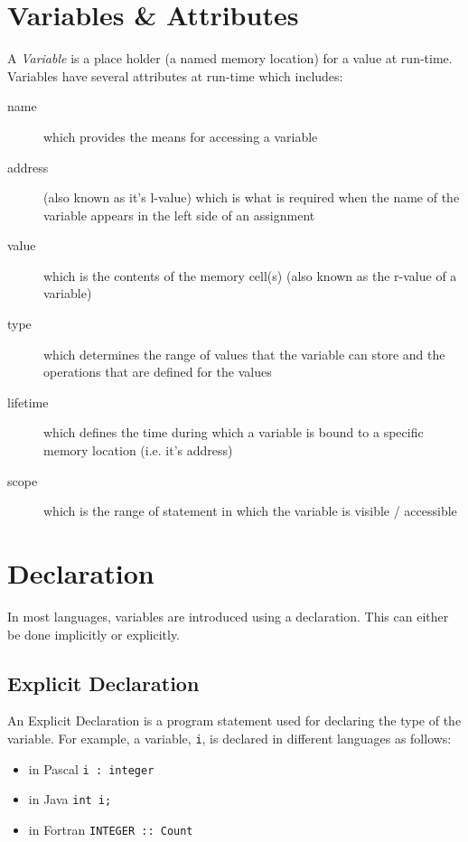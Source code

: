 

\section{Variables \& Attributes}
A \textit{Variable} is a place holder (a named memory location) for a value at run-time. Variables have several attributes at run-time which includes:
\begin{description}
    \item[name] which provides the means for accessing a variable
    \item[address] (also known as it's l-value) which is what is required when the name of the variable appears in the left side of an assignment 
    \item[value] which is the contents of the memory cell(s) (also known as the r-value of a variable)
    \item[type] which determines the range of values that the variable can store and the operations that are defined for the values
    \item[lifetime] which defines the time during which a variable is bound to a specific memory location (i.e. it's address) 
    \item[scope] which is the range of statement in which the variable is visible / accessible 
\end{description}

\section{Declaration}
In most languages, variables are introduced using a declaration. This can either be done implicitly or explicitly.
\subsection{Explicit Declaration}
An Explicit Declaration is a program statement used for declaring the type of the variable. For example, a variable, \verb|i|, is declared in different languages as follows:
\begin{itemize}
    \item in Pascal \verb|i : integer|
    \item in Java \verb|int i;|
    \item in Fortran \verb|INTEGER :: Count|
\end{itemize}
